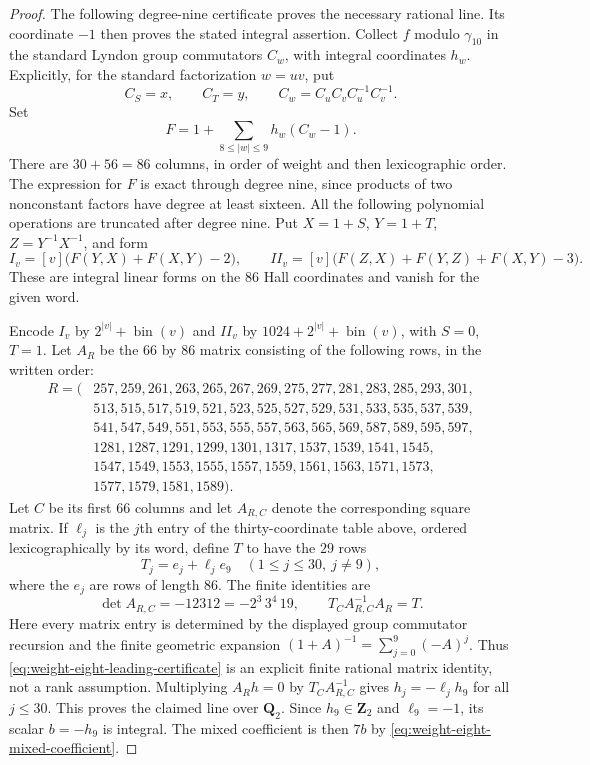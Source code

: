 \begin{proof}
The following degree-nine certificate proves the necessary rational
line. Its coordinate $-1$ then proves the stated integral assertion.
Collect $f$ modulo $\gamma_{10}$ in the standard Lyndon group
commutators $C_w$, with integral coordinates $h_w$. Explicitly, for the
standard factorization $w=uv$, put
\[
 C_S=x,\qquad C_T=y,\qquad C_w=C_uC_vC_u^{-1}C_v^{-1}.
\]
Set
\[
 F=1+\sum_{8\le |w|\le9}h_w(C_w-1).
\]
There are $30+56=86$ columns, in order of weight and then lexicographic
order. The expression for $F$ is exact through degree nine, since
products of two nonconstant factors have degree at least sixteen.
All the following polynomial operations are truncated after degree
nine. Put $X=1+S$, $Y=1+T$, $Z=Y^{-1}X^{-1}$, and form
\[
 I_v=[v]\bigl(F(Y,X)+F(X,Y)-2\bigr),\qquad
 II_v=[v]\bigl(F(Z,X)+F(Y,Z)+F(X,Y)-3\bigr).
\]
These are integral linear forms on the $86$ Hall coordinates and
vanish for the given word.

Encode $I_v$ by $2^{|v|}+\operatorname{bin}(v)$ and $II_v$ by
$1024+2^{|v|}+\operatorname{bin}(v)$, with $S=0$, $T=1$. Let $A_R$
be the $66$ by $86$ matrix consisting of the following rows, in the
written order:
\[
\begin{aligned}
R=( &257,259,261,263,265,267,269,275,277,281,283,285,293,301,\\
    &513,515,517,519,521,523,525,527,529,531,533,535,537,539,\\
    &541,547,549,551,553,555,557,563,565,569,587,589,595,597,\\
    &1281,1287,1291,1299,1301,1317,1537,1539,1541,1545,\\
    &1547,1549,1553,1555,1557,1559,1561,1563,1571,1573,\\
    &1577,1579,1581,1589).
\end{aligned}
\]
Let $C$ be its first $66$ columns and let $A_{R,C}$ denote the
corresponding square matrix. If $\ell_j$ is the $j$th entry of the
thirty-coordinate table above, ordered lexicographically by its word,
define $T$ to have the $29$ rows
\[
 T_j=e_j+\ell_j e_9\quad(1\le j\le30,\ j\ne9),
\]
where the $e_j$ are rows of length $86$. The finite identities are
\begin{equation}\label{eq:weight-eight-leading-certificate}
 \det A_{R,C}=-12312=-2^3\,3^4\,19,
 \qquad
 T_C A_{R,C}^{-1}A_R=T.
\end{equation}
Here every matrix entry is determined by the displayed group
commutator recursion and the finite geometric expansion
$(1+A)^{-1}=\sum_{j=0}^{9}(-A)^j$. Thus
\eqref{eq:weight-eight-leading-certificate} is an explicit finite
rational matrix identity, not a rank assumption. Multiplying
$A_Rh=0$ by $T_C A_{R,C}^{-1}$ gives
$h_j=-\ell_jh_9$ for all $j\le30$. This proves the claimed line
over $\mathbf Q_2$. Since $h_9\in\mathbf Z_2$ and $\ell_9=-1$,
its scalar $b=-h_9$ is integral. The mixed coefficient is then
$7b$ by \eqref{eq:weight-eight-mixed-coefficient}.
\end{proof}

